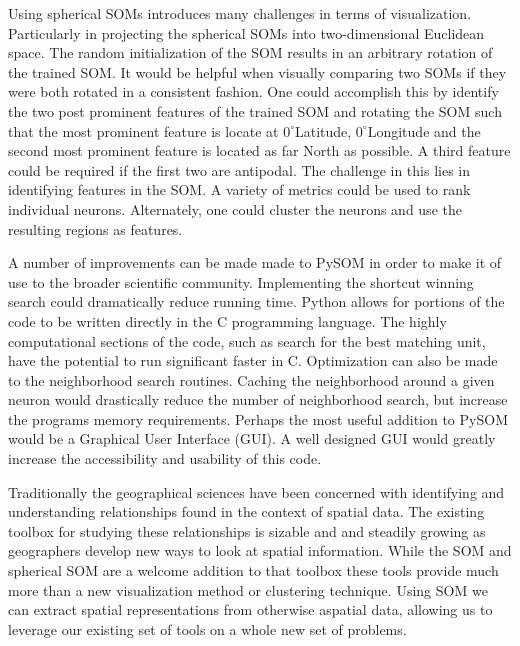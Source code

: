 Using spherical SOMs introduces many challenges in terms of visualization.
Particularly in projecting the spherical SOMs into two-dimensional Euclidean
space.  The random initialization of the SOM results in an arbitrary rotation of
the trained SOM.  It would be helpful when visually comparing two SOMs if they
were both rotated in a consistent fashion. One could accomplish this by identify
the two post prominent features of the trained SOM and rotating the SOM such
that the most prominent feature is locate at $0^\circ$Latitude,
$0^\circ$Longitude and the second most prominent feature is located as far North
as possible. A third feature could be required if the first two are antipodal.
The challenge in this lies in identifying features in the SOM.  A variety of
metrics could be used to rank individual neurons. Alternately, one could cluster
the neurons and use the resulting regions as features.

A number of improvements can be made made to PySOM in order to make it of use to
the broader scientific community.  Implementing the shortcut winning search
could dramatically reduce running time.  Python allows for portions of the code
to be written directly in the C programming language.  The highly computational
sections of the code, such as search for the best matching unit, have the
potential to run significant faster in C. Optimization can also be made to the
neighborhood search routines.  Caching the neighborhood around a given neuron
would drastically reduce the number of neighborhood search, but increase the
programs memory requirements.  Perhaps the most useful addition to PySOM would
be a Graphical User Interface (GUI).  A well designed GUI would greatly increase the
accessibility and usability of this code.

Traditionally the geographical sciences have been concerned with identifying and
understanding relationships found in the context of spatial data.  
The existing toolbox for studying these relationships is sizable and
and steadily growing as geographers develop new ways to look at spatial
information.  While the SOM and spherical SOM are a welcome addition to that
toolbox these tools provide much more than a new visualization method or
clustering technique.  Using SOM we can extract spatial representations from
otherwise aspatial data, allowing us to leverage our existing set of
tools on a whole new set of problems.



